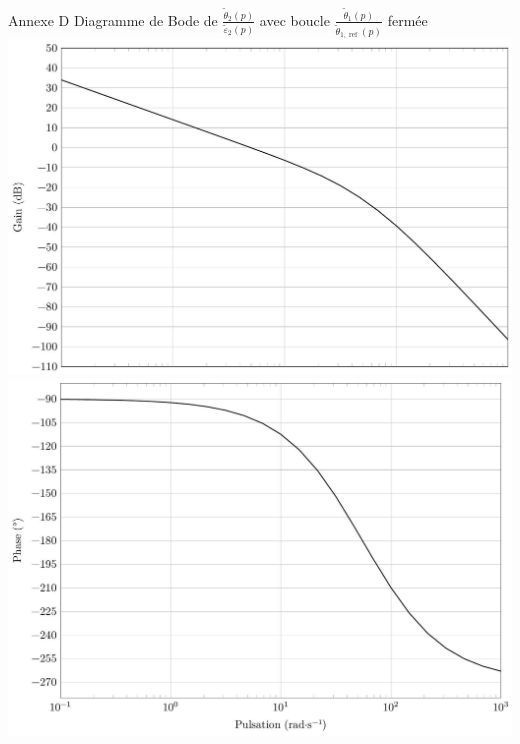 \documentclass[10pt]{article}
\begin{document}
Annexe D Diagramme de Bode de $\frac{\tilde{\theta}_{2}(p)}{\tilde{\varepsilon}_{2}(p)}$ avec boucle $\frac{\tilde{\theta}_{1}(p)}{\tilde{\theta}_{1, \text { ref }}(p)}$ fermée\\
\includegraphics[max width=\textwidth, center]{2025_07_03_97545f5dc188959e5663g-15}\\
\includegraphics[max width=\textwidth, center]{2025_07_03_97545f5dc188959e5663g-15(1)}
\end{document}
